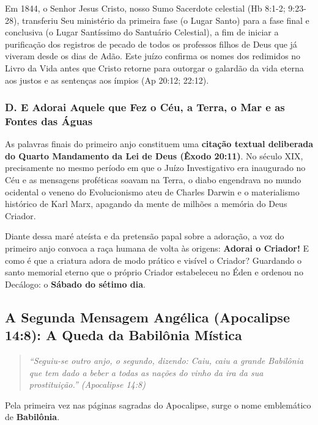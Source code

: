 Em 1844, o Senhor Jesus Cristo, nosso Sumo Sacerdote celestial (Hb 8:1-2; 9:23-28), transferiu Seu ministério da primeira fase (o Lugar Santo) para a fase final e conclusiva (o Lugar Santíssimo do Santuário Celestial), a fim de iniciar a purificação dos registros de pecado de todos os professos filhos de Deus que já viveram desde os dias de Adão. Este juízo confirma os nomes dos redimidos no Livro da Vida antes que Cristo retorne para outorgar o galardão da vida eterna aos justos e as sentenças aos ímpios (Ap 20:12; 22:12).


\subsubsection*{D. E Adorai Aquele que Fez o Céu, a Terra, o Mar e as Fontes das Águas}

As palavras finais do primeiro anjo constituem uma \textbf{citação textual deliberada do Quarto Mandamento da Lei de Deus (Êxodo 20:11)}. No século XIX, precisamente no mesmo período em que o Juízo Investigativo era inaugurado no Céu e as mensagens proféticas soavam na Terra, o diabo engendrava no mundo ocidental o veneno do Evolucionismo ateu de Charles Darwin e o materialismo histórico de Karl Marx, apagando da mente de milhões a memória do Deus Criador.

Diante dessa maré ateísta e da pretensão papal sobre a adoração, a voz do primeiro anjo convoca a raça humana de volta às origens: \textbf{Adorai o Criador!} E como é que a criatura adora de modo prático e visível o Criador? Guardando o santo memorial eterno que o próprio Criador estabeleceu no Éden e ordenou no Decálogo: o \textbf{Sábado do sétimo dia}.



\subsection{A Segunda Mensagem Angélica (Apocalipse 14:8): A Queda da Babilônia Mística}



\begin{quote}
\itshape \textit{``Seguiu-se outro anjo, o segundo, dizendo: Caiu, caiu a grande Babilônia que tem dado a beber a todas as nações do vinho da ira da sua prostituição.''} (Apocalipse 14:8)
\end{quote}


Pela primeira vez nas páginas sagradas do Apocalipse, surge o nome emblemático de \textbf{Babilônia}.


